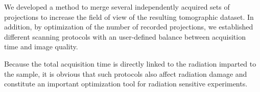 We developed a method to merge several independently acquired sets of projections to increase the field of view of the resulting tomographic dataset. In addition, by optimization of the number of recorded projections, we established different scanning protocols with an user-defined balance between acquisition time and image quality.

Because the total acquisition time is directly linked to the radiation imparted to the sample, it is obvious that such protocols also affect radiation damage and constitute an important optimization tool for radiation sensitive experiments.
